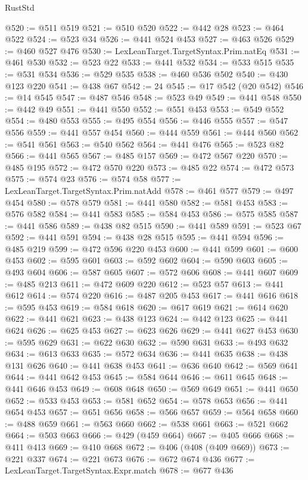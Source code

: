 \begin{lexlean}{RustStd}
\begin{coremodule}
@520 := @511 @519
@521 := @510 @520
@522 := @442 @28
@523 := @464 @522
@524 := @523 @34
@526 := @441 @524 @453
@527 := @463 @526
@529 := @460 @527 @476
@530 := LexLeanTarget.TargetSyntax.Prim.natEq
@531 := @461 @530
@532 := @523 @22
@533 := @441 @532
@534 := @533 @515
@535 := @531 @534
@536 := @529 @535
@538 := @460 @536 @502
@540 := @430 @123 @220
@541 := @438 @67
@542 := 24
@545 := @17 @542 (@20 @542)
@546 := @14 @545
@547 := @487 @546
@548 := @523 @49
@549 := @441 @548
@550 := @442 @49
@551 := @441 @550
@552 := @551 @453
@553 := @549 @552
@554 := @480 @553
@555 := @495 @554
@556 := @446 @555
@557 := @547 @556
@559 := @441 @557 @454
@560 := @444 @559
@561 := @444 @560
@562 := @541 @561
@563 := @540 @562
@564 := @441 @476
@565 := @523 @82
@566 := @441 @565
@567 := @485 @157
@569 := @472 @567 @220
@570 := @485 @195
@572 := @472 @570 @220
@573 := @485 @22
@574 := @472 @573
@575 := @574 @23
@576 := @574 @58
@577 := LexLeanTarget.TargetSyntax.Prim.natAdd
@578 := @461 @577
@579 := @497 @454
@580 := @578 @579
@581 := @441 @580
@582 := @581 @453
@583 := @576 @582
@584 := @441 @583
@585 := @584 @453
@586 := @575 @585
@587 := @441 @586
@589 := @438 @82 @515
@590 := @441 @589
@591 := @523 @67
@592 := @441 @591
@594 := @438 @28 @515
@595 := @441 @594
@596 := @485 @219
@599 := @472 @596 @220 @453
@600 := @441 @599
@601 := @600 @453
@602 := @595 @601
@603 := @592 @602
@604 := @590 @603
@605 := @493 @604
@606 := @587 @605
@607 := @572 @606
@608 := @441 @607
@609 := @485 @213
@611 := @472 @609 @220
@612 := @523 @57
@613 := @441 @612
@614 := @574 @220
@616 := @487 @205 @453
@617 := @441 @616
@618 := @595 @453
@619 := @584 @618
@620 := @617 @619
@621 := @614 @620
@622 := @441 @621
@623 := @438 @123
@624 := @442 @123
@625 := @441 @624
@626 := @625 @453
@627 := @623 @626
@629 := @441 @627 @453
@630 := @595 @629
@631 := @622 @630
@632 := @590 @631
@633 := @493 @632
@634 := @613 @633
@635 := @572 @634
@636 := @441 @635
@638 := @438 @131 @626
@640 := @441 @638 @453
@641 := @636 @640
@642 := @569 @641
@644 := @441 @642 @453
@645 := @584 @644
@646 := @611 @645
@648 := @441 @646 @453
@649 := @608 @648
@650 := @569 @649
@651 := @441 @650
@652 := @533 @453
@653 := @581 @652
@654 := @578 @653
@656 := @441 @654 @453
@657 := @651 @656
@658 := @566 @657
@659 := @564 @658
@660 := @488 @659
@661 := @563 @660
@662 := @538 @661
@663 := @521 @662
@664 := @503 @663
@666 := @429 (@459 @664)
@667 := @405 @666
@668 := @411 @413
@669 := @410 @668
@672 := @406 (@408 (@409 @669))
@673 := @221 @337
@674 := @221 @673
@676 := @672 @674 @436
@677 := LexLeanTarget.TargetSyntax.Expr.match
@678 := @677 @436

\end{coremodule}
\end{lexlean}
